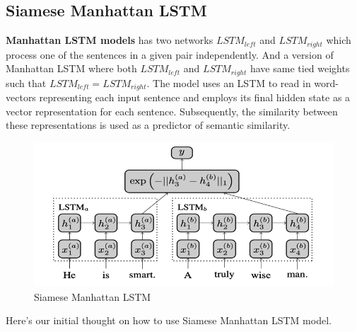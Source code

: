 \documentclass{article}
\begin{document}
\subsection{Siamese Manhattan LSTM}

\textbf{Manhattan LSTM models} has two networks $LSTM_{left}$ and $LSTM_{right}$ which process one of the sentences in a given pair independently. And a version of Manhattan LSTM where both $LSTM_{left}$ and $LSTM_{right}$ have same tied weights such that $LSTM_{left} = LSTM_{right}$. The model uses an LSTM to read in word-vectors representing each input sentence and employs its final hidden state as a vector representation for each sentence. Subsequently, the similarity between these representations is used as a predictor of semantic similarity.

\begin{figure}[ht]
\vskip 0.2in
\begin{center}
\centerline{\includegraphics[width=\columnwidth]{Picture1.png}}
\caption{Siamese Manhattan LSTM}
\label{icml-historical}
\end{center}
\vskip -0.2in
\end{figure}
Here's our initial thought on how to use Siamese Manhattan LSTM model.
\end{document}
